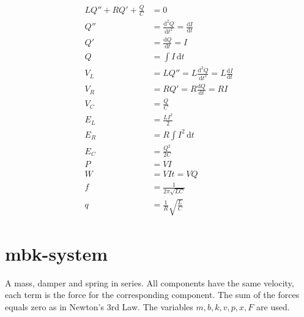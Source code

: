 \documentclass[]{../common/elementary-physics}
\begin{document}
\begin{subequations}
\begin{align}
L Q'' + R Q' + \frac{Q}{C} &= 0 \\
Q'' &= \frac{\mathrm{d}^2 Q}{\mathrm{d}t^2} = \frac{\mathrm{d}I}{\mathrm{d}t} \\
Q' &= \frac{\mathrm{d}Q}{\mathrm{d}t} = I \tag{definition of current} \\
Q &= \int I \, \mathrm{d}t \\
V_L &= L Q'' = L \frac{\mathrm{d}^2 Q}{\mathrm{d}t^2} = L \frac{\mathrm{d}I}{\mathrm{d}t} \\
V_R &= R Q' = R \frac{\mathrm{d}Q}{\mathrm{d}t} = R I \tag{Ohm's law} \\
V_C &= \frac{Q}{C} \tag{definition of capacitance} \\
E_L &= \frac{L I^2}{2} \tag{energy in a coil} \\
E_R &= R \int I^2 \, \mathrm{d}t \tag{losses} \\
E_C &= \frac{Q^2}{2 C} \tag{energy in a capacitor} \\
P &= V I \tag{power} \\
W &= V I t = V Q \tag{work} \\
f &= \frac{1}{2 \pi \sqrt{L C}} \tag{frequency} \\
q &= \frac{1}{R} \sqrt{\frac{L}{C}} \tag{quality factor}
\end{align}
\end{subequations}

\pagebreak

\section{mbk-system}

A mass, damper and spring in series.
All components have the same velocity, each term is the force for the corresponding component.
The sum of the forces equals zero as in Newton's 3rd Law.
The variables $m,b,k,v,p,x,F$ are used.
\end{document}
